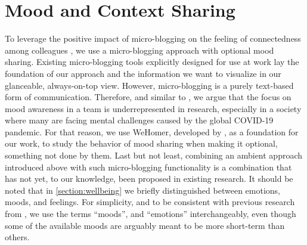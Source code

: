 \section{Mood and Context Sharing}
To leverage the positive impact of micro-blogging on the feeling of connectedness among colleagues \autocite{dullemond2013fixing}, we use a micro-blogging approach with optional mood sharing. 
Existing micro-blogging tools explicitly designed for use at work lay the foundation of our approach and the information we want to visualize in our glanceable, always-on-top view. However, micro-blogging is a purely text-based form of communication.
Therefore, and similar to \autocite{mora2011supporting}, we argue that the focus on mood awareness in a team is underrepresented in research, especially in a society where many are facing mental challenges caused by the global COVID-19 pandemic. 
For that reason, we use WeHomer, developed by \textcite{dullemond2013fixing}, as a foundation for our work, to study the behavior of mood sharing when making it optional, something not done by them. Last but not least, combining an ambient approach introduced above with such micro-blogging functionality is a combination that has not yet, to our knowledge, been proposed in existing research. It should be noted that in \autoref{section:wellbeing} we briefly distinguished between emotions, moods, and feelings. For simplicity, and to be consistent with previous research from \textcite{dullemond2013fixing}, we use the terms \enquote{moods}, and \enquote{emotions} interchangeably, even though some of the available moods are arguably meant to be more short-term than others.

